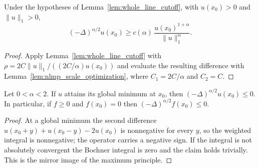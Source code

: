 \begin{theorem}\label{thm:whole_line_nlmp}
\leanok
Under the hypotheses of Lemma~\ref{lem:whole_line_cutoff}, with $u(x_0) > 0$ and $\lVert u\rVert_1 > 0$,
\[
  (-\Delta)^{\alpha/2} u(x_0) \ge c(\alpha)\, \frac{u(x_0)^{1+\alpha}}{\lVert u \rVert_1^{\alpha}}.
\]
\end{theorem}

\begin{proof}
\leanok
Apply Lemma~\ref{lem:whole_line_cutoff} with $\rho = 2 C \lVert u\rVert_1 / ((2C/\alpha) u(x_0))$ and evaluate the resulting difference with Lemma~\ref{lem:nlmp_scale_optimization}, where $C_1 = 2C/\alpha$ and $C_2 = C$.
\end{proof}

\begin{theorem}\label{thm:whole_line_linear_min_principle}
\leanok
Let $0 < \alpha < 2$. If $u$ attains its global minimum at $x_0$, then $(-\Delta)^{\alpha/2} u(x_0) \le 0$. In particular, if $f \ge 0$ and $f(x_0) = 0$ then $(-\Delta)^{\alpha/2} f(x_0) \le 0$.
\end{theorem}

\begin{proof}
\leanok
At a global minimum the second difference $u(x_0+y) + u(x_0-y) - 2u(x_0)$ is nonnegative for every $y$, so the weighted integral is nonnegative; the operator carries a negative sign. If the integral is not absolutely convergent the Bochner integral is zero and the claim holds trivially. This is the mirror image of the maximum principle.
\end{proof}
